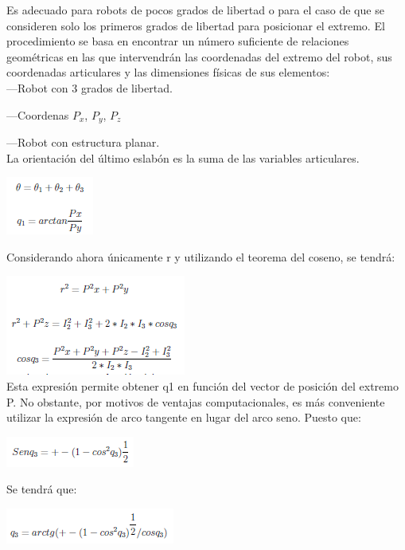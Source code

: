 \documentclass[11pt,a4paper,oldfontcommands,oneside]{memoir}
\begin{document}
Es adecuado para robots de pocos grados de libertad o para el caso de que se consideren solo los primeros grados de libertad para posicionar el extremo. El procedimiento se basa en encontrar un número suficiente de relaciones geométricas en las que intervendrán las coordenadas del extremo del robot, sus coordenadas articulares y las dimensiones físicas de sus elementos:\\
 
---Robot con 3 grados de libertad.

---Coordenas $P_x$, $P_y$, $P_z$ 

---Robot con estructura planar.\\
 
La orientación del último eslabón es la suma de las variables articulares.

\includegraphics[scale=1.5]{1} 

Considerando ahora únicamente r y utilizando el teorema del coseno, se tendrá:

\includegraphics[scale=1.5]{2}\\


Esta expresión permite obtener q1 en función del vector de posición del extremo P. No obstante, por motivos de ventajas computacionales, es más conveniente utilizar la expresión de arco tangente en lugar del arco seno. Puesto que: 

\includegraphics[scale=1.5]{3}

Se tendrá que: 

\includegraphics[scale=1.5]{4}\\
  
\end{document}
